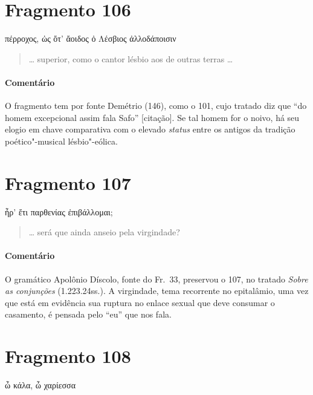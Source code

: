 {\pagebreak
\section{Fragmento 106}

\begin{gkverse}
πέρροχος, ὠς ὄτ’ ἄοιδος ὀ Λέσβιος ἀλλοδάποισιν
\end{gkverse}

\begin{verse}
\ldots{} superior, como o cantor lésbio aos de outras terras \ldots{}
\end{verse}

{\paragraph{Comentário} O fragmento tem por fonte Demétrio (146), como o 101, cujo tratado diz que
``do homem excepcional assim fala Safo” [citação]. Se tal homem for o
noivo, há seu elogio em chave comparativa com o elevado \textit{status}
entre os antigos da tradição poético"-musical lésbio"-eólica.}


\section{Fragmento 107}

\begin{gkverse}
ἦρ’ ἔτι παρθενίας ἐπιβάλλομαι;
\end{gkverse}

\begin{verse}
\ldots{} será que ainda anseio pela virgindade?
\end{verse}

{\paragraph{Comentário} O gramático Apolônio Díscolo, fonte do Fr.~33, preservou o 107, no tratado
\textit{Sobre as conjunções} (1.223.24ss.). A virgindade, tema recorrente no epitalâmio, uma
vez que está em evidência sua ruptura no enlace sexual que deve consumar o
casamento, é pensada pelo “eu” que nos fala.}


\section{Fragmento 108}

\begin{gkverse}
ὦ κάλα, ὦ χαρίεσσα
\end{gkverse}

}
